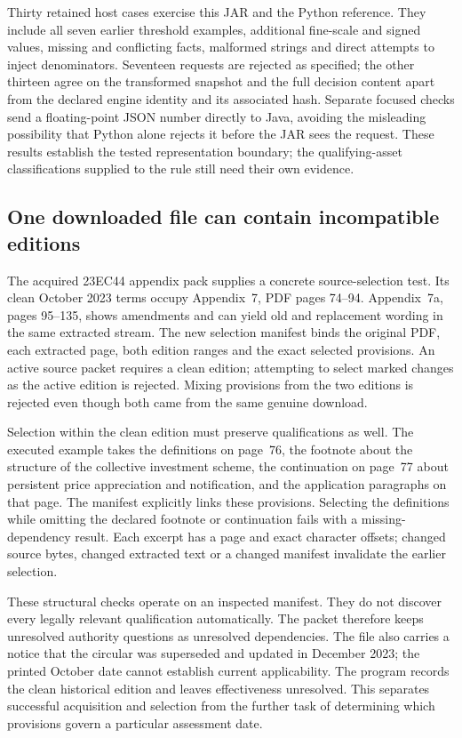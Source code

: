 Thirty retained host cases exercise this JAR and the Python reference. They
include all seven earlier threshold examples, additional fine-scale and signed
values, missing and conflicting facts, malformed strings and direct attempts
to inject denominators. Seventeen requests are rejected as specified; the
other thirteen agree on the transformed snapshot and the full decision content
apart from the declared engine identity and its associated hash. Separate
focused checks send a floating-point JSON number directly to Java, avoiding
the misleading possibility that Python alone rejects it before the JAR sees
the request. These results establish the tested representation boundary; the
qualifying-asset classifications supplied to the rule still need their own
evidence.

\subsection{One downloaded file can contain incompatible editions}

The acquired 23EC44 appendix pack supplies a concrete source-selection test.
Its clean October 2023 terms occupy Appendix~7, PDF pages 74--94. Appendix~7a,
pages 95--135, shows amendments and can yield old and replacement wording in
the same extracted stream. The new selection manifest binds the original PDF,
each extracted page, both edition ranges and the exact selected provisions.
An active source packet requires a clean edition; attempting to select marked
changes as the active edition is rejected. Mixing provisions from the two
editions is rejected even though both came from the same genuine download.

Selection within the clean edition must preserve qualifications as well. The
executed example takes the definitions on page~76, the footnote about the
structure of the collective investment scheme, the continuation on page~77
about persistent price appreciation and notification, and the application
paragraphs on that page. The manifest explicitly links these provisions.
Selecting the definitions while omitting the declared footnote or continuation
fails with a missing-dependency result. Each excerpt has a page and exact
character offsets; changed source bytes, changed extracted text or a changed
manifest invalidate the earlier selection.

These structural checks operate on an inspected manifest. They do not discover
every legally relevant qualification automatically. The packet therefore keeps
unresolved authority questions as unresolved dependencies. The file also carries
a notice that the circular was superseded and updated in December 2023; the
printed October date cannot establish current applicability. The program
records the clean historical edition and leaves effectiveness unresolved. This
separates successful acquisition and selection from the further task of
determining which provisions govern a particular assessment date.


